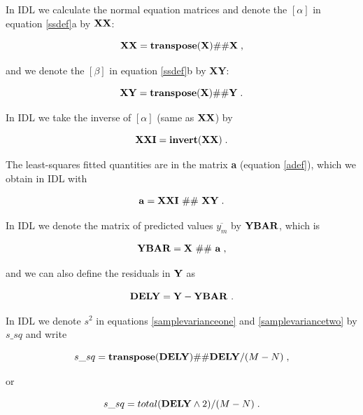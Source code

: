 \documentclass[psfig,preprint]{aastex}
\begin{document}
	In IDL we calculate the normal equation matrices and denote the
$[\alpha]$ in equation \ref{ssdef}a by ${\bf XX}$:

\begin{mathletters} \label{eqn24}
\begin{equation}
{\bf XX} = {\bf transpose(X) \# \# X} \; ,
\end{equation}

\noindent and we denote the $[\beta]$ in equation \ref{ssdef}b by {\bf
XY}:

\begin{equation}
{\bf XY} = {\bf transpose(X) \# \# Y} \; .
\end{equation}
\end{mathletters}

\noindent In IDL we take the inverse of $[\alpha]$ (same as $\bf XX$) by

\begin{equation}
{\bf XXI} = {\bf invert(XX)} \; .
\end{equation}

	The least-squares fitted quantities are in the matrix {\bf a}
(equation \ref{adef}), which we obtain in IDL with

\begin{equation}
{\bf a} = {\bf XXI \ \#\# \ XY} \; .
\end{equation}

	In IDL we denote the matrix of predicted values $\overline{
y_m}$ by ${\bf YBAR}$, which is 

\begin{equation}
\label{bteqn}
{\bf YBAR} = {\bf X \ \#\# \ a} \; ,
\end{equation}

\noindent and we can also define the residuals in $\bf Y$ as

\begin{equation}
{\bf DELY} = {\bf Y - YBAR} \ .
\end{equation}

\noindent In IDL we denote $s^2$ in equations \ref{samplevarianceone}
and \ref{samplevariancetwo} by $s\_sq$ and write 

\begin{mathletters}
\label{sigsq}
\begin{equation}
s\_sq = {\bf transpose(DELY) \#\# DELY}/(M-N) \; ,
\end{equation}

\noindent or

\begin{equation}
s\_sq = total({ \bf DELY} \wedge 2)/(M-N) \; . 
\end{equation}
\end{mathletters}
\end{document}
